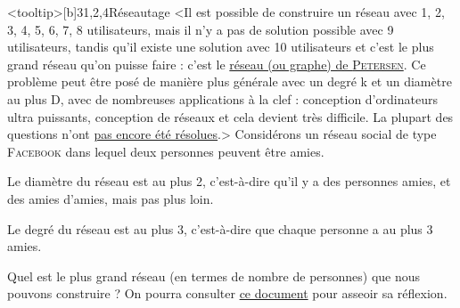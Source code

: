 \begin{quiz}[title={Réseaux sociaux}]
\begin{quizquestion*}<tooltip>[b]{3}{1,2,4}{Réseautage}
<Il est possible de construire un réseau avec 1, 2, 3, 4, 5, 6, 7, 8 utilisateurs, mais il n'y a pas de solution possible avec 9 utilisateurs, tandis qu'il existe une solution avec 10 utilisateurs et c'est le plus grand réseau qu'on puisse faire : c'est le \href{https://fr.wikipedia.org/wiki/Graphe_de_Petersen}{réseau (ou graphe) de \textsc{Petersen}}.
Ce problème peut être posé de manière plus générale avec un degré k et un diamètre au plus D, avec de nombreuses applications à la clef : conception d'ordinateurs ultra puissants, conception de réseaux et cela devient très difficile. La plupart des questions n'ont \href{https://en.wikipedia.org/wiki/Table_of_the_largest_known_graphs_of_a_given_diameter_and_maximal_degree}{pas encore été résolues}.>
Considérons un réseau social de type \textsc{Facebook} dans lequel deux personnes peuvent être amies.
\begin{jazzitemize}
\item Le diamètre du réseau est au plus 2, c'est-à-dire qu'il y a des personnes amies, et des amies d'amies, mais pas plus loin.
\item Le degré du réseau est au plus 3, c'est-à-dire que chaque personne a au plus 3 amies.
\end{jazzitemize}
Quel est le plus grand réseau (en termes de nombre de personnes) que nous pouvons construire ?
On pourra consulter \href{https://hal.inria.fr/hal-01383665/document}{ce document} pour asseoir sa réflexion. 
\end{quizquestion*}
\end{quiz}

